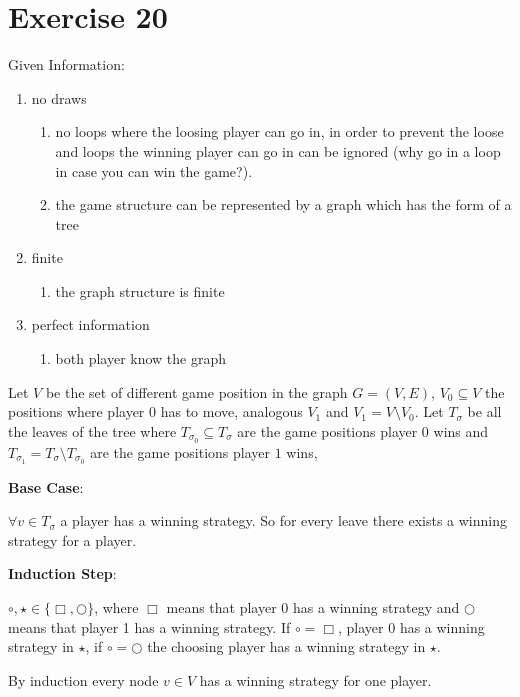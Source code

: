\documentclass[10pt]{article}
\begin{document}
\section*{Exercise 20}
  Given Information:
    \begin{enumerate}
      \item no draws
      \begin{enumerate}
        \item no loops where the loosing player can go in, in order to prevent
        the loose and loops the winning player can go in can be ignored (why go
        in a loop in case you can win the game?).
        \item the game structure can be represented by a graph which has the
        form of a tree
      \end{enumerate}
      \item finite
      \begin{enumerate}
        \item the graph structure is finite
      \end{enumerate}
      \item perfect information
      \begin{enumerate}
        \item both player know the graph
      \end{enumerate}
    \end{enumerate}

    Let $V$ be the set of different game position in the graph $G=(V,E)$,
    $V_0\subseteq V$ the positions where player 0 has to move, analogous $V_1$
    and $V_1 = V\setminus V_0$. Let $T_\sigma$ be all the leaves of the tree where
    $T_{\sigma_0}\subseteq T_\sigma$ are the game positions player $0$ wins and
    $T_{\sigma_1}= T_\sigma\setminus T_{\sigma_0}$ are the game positions player $1$ wins,

    \textbf{Base Case}: 

    $\forall v \in T_{\sigma}$ a player has a winning strategy. So for
    every leave there exists a winning strategy for a player.
    
    \textbf{Induction Step}:

    $ \circ,\star \in \{\Box , \bigcirc\}$, where $\Box$ means that player 0 has a winning
    strategy and $\bigcirc$ means that player 1 has a winning strategy. If $
    \circ = \Box$, player 0 has a winning strategy in $\star$, if $\circ =
    \bigcirc$ the choosing player has a winning strategy in $\star$.

    By induction every node $v\in V$ has a winning strategy for one player. 
\end{document}
